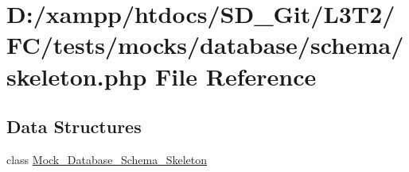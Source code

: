 \hypertarget{tests_2mocks_2database_2schema_2skeleton_8php}{}\section{D\+:/xampp/htdocs/\+S\+D\+\_\+\+Git/\+L3\+T2/\+F\+C/tests/mocks/database/schema/skeleton.php File Reference}
\label{tests_2mocks_2database_2schema_2skeleton_8php}
\subsection*{Data Structures}
\begin{DoxyCompactItemize}
\item 
class \hyperlink{class_mock___database___schema___skeleton}{Mock\+\_\+\+Database\+\_\+\+Schema\+\_\+\+Skeleton}
\end{DoxyCompactItemize}
